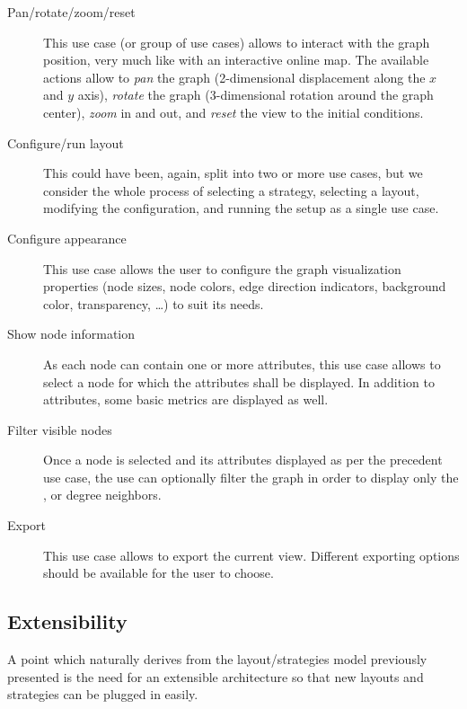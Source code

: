 \begin{description}
  \item[Pan/rotate/zoom/reset] This use case (or group of use cases) allows to interact with the graph position, very much like with an interactive online map. The available actions allow to \emph{pan} the graph (2-dimensional displacement along the $x$ and $y$ axis), \emph{rotate} the graph (3-dimensional rotation around the graph center), \emph{zoom} in and out, and \emph{reset} the view to the initial conditions.
  \item[Configure/run layout] This could have been, again, split into two or more use cases, but we consider the whole process of selecting a strategy, selecting a layout, modifying the configuration, and running the setup as a single use case.
  \item[Configure appearance] This use case allows the user to configure the graph visualization properties (node sizes, node colors, edge direction indicators, background color, transparency, \ldots) to suit its needs.
  \item[Show node information] As each node can contain one or more attributes, this use case allows to select a node for which the attributes shall be displayed. In addition to attributes, some basic metrics are displayed as well.
  \item[Filter visible nodes] Once a node is selected and its attributes displayed as per the precedent use case, the use can optionally filter the graph in order to display only the ,  or  degree neighbors.
  \item[Export] This use case allows to export the current view. Different exporting options should be available for the user to choose.
\end{description}

\subsection{Extensibility}

A point which naturally derives from the layout/strategies model previously presented is the need for an extensible architecture so that new layouts and strategies can be plugged in easily.

